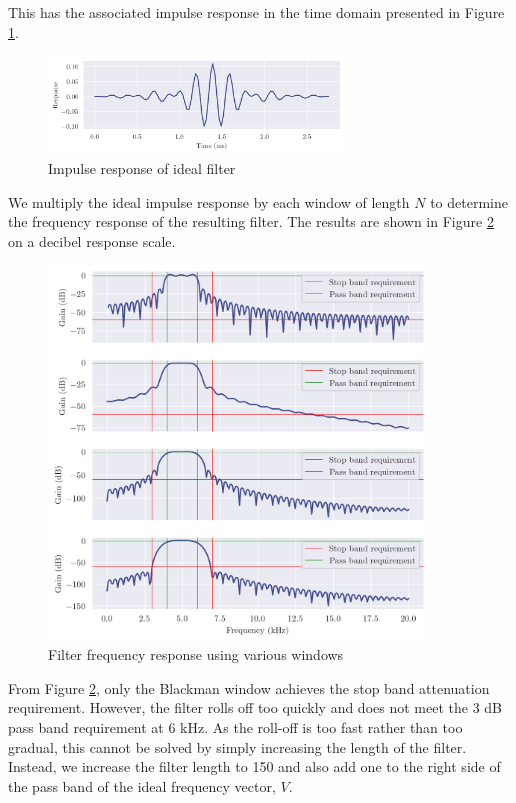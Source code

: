 This has the associated impulse response in the time domain presented in Figure \ref{fig:q3_ideal_impz}.

\begin{figure}[ht]
    \centering
    \includegraphics[width=0.7\textwidth]{images/q3_ideal_impz.png}
    \caption{Impulse response of ideal filter}
    \label{fig:q3_ideal_impz}
\end{figure}

\newpage

We multiply the ideal impulse response by each window of length $N$ to determine the frequency response of the resulting filter. The results are shown in Figure \ref{fig:q3_window_freqzs} on a decibel response scale.

\begin{figure}[ht]
    \centering
    \includegraphics[width=0.9\textwidth]{images/q3_window_freqzs.png}
    \caption{Filter frequency response using various windows}
    \label{fig:q3_window_freqzs}
\end{figure}

From Figure \ref{fig:q3_window_freqzs}, only the Blackman window achieves the stop band attenuation requirement. However, the filter rolls off too quickly and does not meet the 3 dB pass band requirement at 6 kHz. As the roll-off is too fast rather than too gradual, this cannot be solved by simply increasing the length of the filter. Instead, we increase the filter length to 150 and also add one to the right side of the pass band of the ideal frequency vector, $V$.


